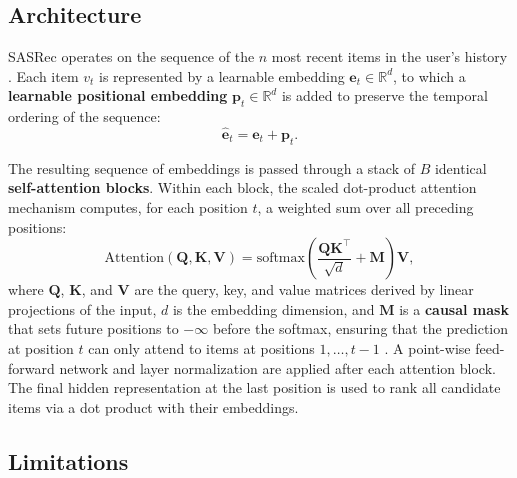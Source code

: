 \documentclass[12pt,a4paper]{report}
\newcommand{\parencite}[1]{\citep{#1}}
\begin{document}
\subsection{Architecture}

SASRec operates on the sequence of the $n$ most recent items in the
user's history \parencite{kang2018self}. Each item $v_t$ is
represented by a learnable embedding $\mathbf{e}_t \in \mathbb{R}^d$,
to which a \textbf{learnable positional embedding} $\mathbf{p}_t
\in \mathbb{R}^d$ is added to preserve the temporal ordering of the
sequence:
\begin{equation}
  \hat{\mathbf{e}}_t = \mathbf{e}_t + \mathbf{p}_t.
\end{equation}

The resulting sequence of embeddings is passed through a stack of
$B$ identical \textbf{self-attention blocks}. Within each block, the
scaled dot-product attention mechanism computes, for each position
$t$, a weighted sum over all preceding positions:
\begin{equation}
  \text{Attention}(\mathbf{Q}, \mathbf{K}, \mathbf{V}) =
    \text{softmax}\!\left(
      \frac{\mathbf{Q}\mathbf{K}^\top}{\sqrt{d}}
      + \mathbf{M}
    \right)\mathbf{V},
\end{equation}
where $\mathbf{Q}$, $\mathbf{K}$, and $\mathbf{V}$ are the query,
key, and value matrices derived by linear projections of the input,
$d$ is the embedding dimension, and $\mathbf{M}$ is a
\textbf{causal mask} that sets future positions to $-\infty$ before
the softmax, ensuring that the prediction at position $t$ can only
attend to items at positions $1, \ldots, t-1$
\parencite{kang2018self}. A point-wise feed-forward network and
layer normalization are applied after each attention block. The final
hidden representation at the last position is used to rank all
candidate items via a dot product with their embeddings.

\subsection{Limitations}
\end{document}
